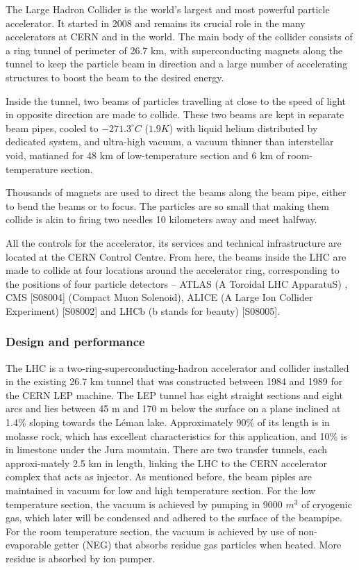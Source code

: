 \documentclass[letterpaper,12pt]{article}
\begin{document}
The Large Hadron Collider \cite{Evans:2008zzb} is the world's largest and most powerful particle accelerator. 
It started in 2008 and remains its crucial role in the many accelerators at CERN and in the world.
The main body of the collider consists of a ring tunnel of perimeter of 26.7 km, with 
superconducting magnets along the tunnel to keep the particle beam in direction
 and a large number of accelerating structures to boost the beam to the desired energy.

Inside the tunnel, two beams of particles travelling at close to the speed of light 
in opposite direction are made to collide. These two beams are kept in separate beam pipes,
cooled to $-271.3^\circ C$ ($1.9K$) with liquid helium distributed by dedicated system, 
 and ultra-high vacuum, a vacuum thinner than 
interstellar void, matianed for 48 km of low-temperature section and 6 km of room-temperature 
section. 

Thousands of magnets are used to direct the beams along the beam pipe, either to bend the beams or
to focus. The particles are so small that making them collide is akin to 
firing two needles 10 kilometers away and meet halfway. 

All the controls for the accelerator, its services and technical infrastructure 
are located at the CERN Control Centre. 
From here, the beams inside the LHC are made to collide at four locations around the accelerator ring, 
corresponding to the positions of four particle detectors – ATLAS (A Toroidal LHC ApparatuS) \cite{PERF-2007-01}, 
CMS [S08004] (Compact Muon Solenoid), ALICE (A Large Ion Collider Experiment) [S08002] 
and LHCb (b stands for beauty) [S08005].


	\subsubsection{Design and performance}

	The LHC is a two-ring-superconducting-hadron accelerator and collider
	installed in the existing 26.7 km tunnel that was constructed between 1984 and 1989 
	for the CERN LEP machine. The LEP tunnel has eight straight sections and eight arcs 
	and lies between 45 m and 170 m below the surface on a plane inclined at 1.4\% sloping towards the Léman lake.
	Approximately 90\% of its length is in molasse rock, which has excellent characteristics for this application,
	and 10\% is in limestone under the Jura mountain. There are two transfer tunnels, 
	each approxi-mately 2.5 km in length, linking the LHC to the CERN accelerator complex that acts as injector.
	As mentioned before, the beam piples are maintained in vacuum for low and high temperature section.
	For the low temperature section, the vacuum is achieved by pumping in 9000 $m^3$ of cryogenic
	gas, which later will be condensed and adhered to the surface of the beampipe. For the room temperature
	section, the vacuum is achieved by use of non-evaporable getter (NEG) that absorbs residue gas particles 
	when heated. More residue is absorbed by ion pumper. 
\end{document}
